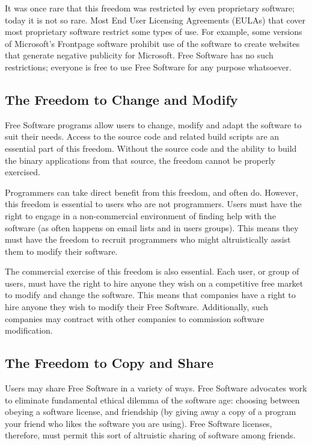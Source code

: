 \documentclass[12pt]{report}
\begin{document}
It was once rare that this freedom was restricted by even proprietary
software; today it is not so rare.  Most End User Licensing Agreements
(EULAs) that cover most proprietary software restrict some types of use.
For example, some versions of Microsoft's Frontpage software prohibit use
of the software to create websites that generate negative publicity for
Microsoft.  Free Software has no such restrictions; everyone is free to
use Free Software for any purpose whatsoever.

\subsection{The Freedom to Change and Modify}

Free Software programs allow users to change, modify and adapt the
software to suit their needs.  Access to the source code and related build
scripts are an essential part of this freedom.  Without the source code
and the ability to build the binary applications from that source, the
freedom cannot be properly exercised.

Programmers can take direct benefit from this freedom, and often do.
However, this freedom is essential to users who are not programmers.
Users must have the right to engage in a non-commercial environment of
finding help with the software (as often happens on email lists and in
users groups).  This means they must have the freedom to recruit
programmers who might altruistically assist them to modify their software.

The commercial exercise of this freedom is also essential.  Each user, or
group of users, must have the right to hire anyone they wish on a
competitive free market to modify and change the software.  This means
that companies have a right to hire anyone they wish to modify their Free
Software.  Additionally, such companies may contract with other companies
to commission software modification.

\subsection{The Freedom to Copy and Share}

Users may share Free Software in a variety of ways.  Free Software
advocates work to eliminate fundamental ethical dilemma of the software
age: choosing between obeying a software license, and friendship (by
giving away a copy of a program your friend who likes the software you are
using).  Free Software licenses, therefore, must permit this sort of
altruistic sharing of software among friends.
\end{document}
